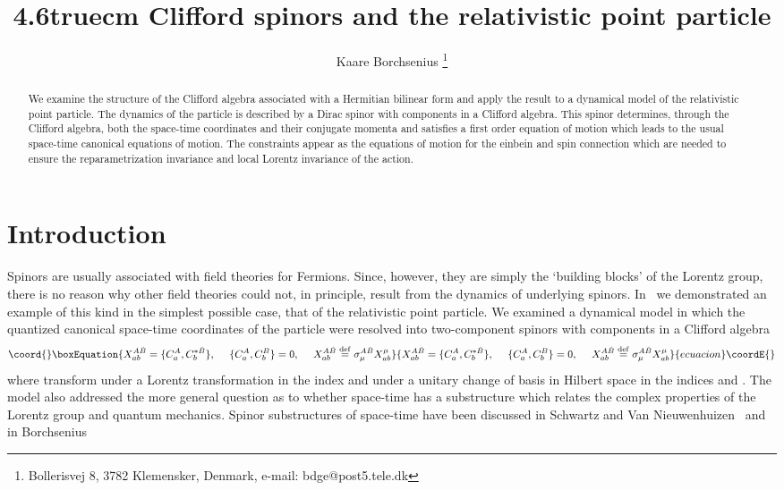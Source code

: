 \documentclass[a4paper,a4paper]{article}
\title{\vglue4.6truecm
Clifford spinors and the relativistic point particle}
\author{Kaare Borchsenius
\thanks{Bollerisvej 8, 3782 Klemensker, Denmark,
e-mail: bdge@post5.tele.dk}}
\date{}
\begin{document}
\maketitle
\begin{abstract}
We examine the structure of the Clifford algebra associated with a Hermitian
bilinear form and apply the result to a dynamical model of the relativistic
point particle. The dynamics of the particle is described by a Dirac spinor with
components in a Clifford algebra. This spinor determines, through the Clifford
algebra, both the space-time coordinates and their conjugate momenta and
satisfies a first order equation of motion which leads to the usual space-time
canonical equations of motion. The constraints appear as the equations of motion
for the einbein and spin connection which are needed to ensure the
reparametrization invariance and local Lorentz invariance of the action. 
\end{abstract}
\pagebreak
\section{Introduction}
Spinors are usually associated with field theories for Fermions. Since, however,
they are simply the `building blocks' of the Lorentz group, there is no reason
why other field theories could not, in principle, result from the dynamics of
underlying spinors. In~\cite{borch4} we demonstrated an example of this kind in
the simplest possible case, that of the relativistic point particle. We examined
a dynamical model in which the quantized canonical space-time coordinates \coordHE{}
of the particle were resolved into two-component spinors \coordHE{} with components in
a Clifford algebra
\begin{equation}\coord{}\boxEquation{ 
X^{A\dot{B}}_{ab} = \{ C^{A}_{a},C^{*\dot{B}}_{b} \}, \ \ \ \ \{
C^{A}_{a},C^{B}_{b} \}=0 ,\ \ \ \ X^{A\dot{B}}_{ab} \stackrel{\mathrm{def}}{=}
\sigma_{\mu}^{A\dot{B}}X^{\mu}_{ab}
\label{a1}
}{ 
X^{A\dot{B}}_{ab} = \{ C^{A}_{a},C^{*\dot{B}}_{b} \}, \ \ \ \ \{
C^{A}_{a},C^{B}_{b} \}=0 ,\ \ \ \ X^{A\dot{B}}_{ab} \stackrel{\mathrm{def}}{=}
\sigma_{\mu}^{A\dot{B}}X^{\mu}_{ab}
}{ecuacion}\coordE{}\end{equation}
where \coordHE{} transform under a Lorentz transformation in the index \myHighlight{$\mu$}\coordHE{}
and under a unitary change of basis in Hilbert space in the indices \coordHE{} and
\coordHE{}. The model also addressed the more general question as to whether space-time
has a substructure which relates the complex properties of the Lorentz group
and quantum mechanics. Spinor substructures of space-time have been discussed in
Schwartz and Van Nieuwenhuizen~\cite{schwartz} and in
Borchsenius~\cite{borch1,borch2,borch3} 
 
\end{document}

